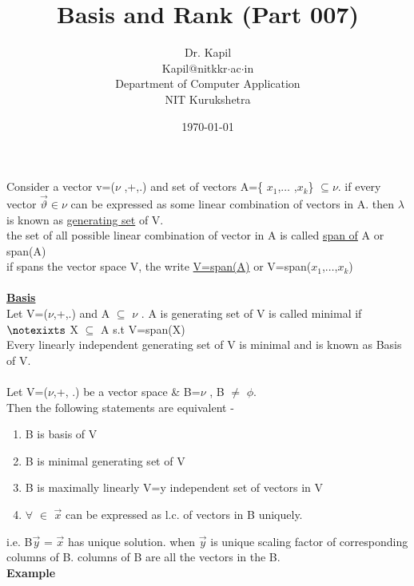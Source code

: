 \documentclass{article}
\title{Basis and Rank (Part 007)}
\author{Dr. Kapil \\Kapil$@$nitkkr$\cdot$ac$\cdot$in\\Department of Computer Application\\NIT Kurukshetra}
\date{\today}
\begin{document}
\maketitle
\thispagestyle{fancy}
Consider a vector v=($\nu$ ,+,.) and set of vectors A=\{ ${x_1}$,$\ldots$ ,${x_k}$\} $\subseteq \nu$. if every vector $\Vec{\vartheta} \in \nu $  can be expressed as some linear combination of vectors in A. then $\lambda$ is known as \underline{generating set} of V. \\

the set of all possible linear combination of vector in A is called \underline{span of} A or span(A)\\
if spans the vector space V,  the write \underline{V=span(A)} or V=span(${x_1}$,$\ldots$,${x_k}$)\\
\\
\textbf{\underline{Basis}}\\
Let V=($\nu$,+,.) and A $\subseteq$ $\nu$ . A is generating set of V is called minimal if \\
$\notexixts$ X $\subseteq$ A s.t V=span(X) \\
Every linearly independent generating set of V is minimal and is known as Basis of V.\\
\\
Let V=($\nu$,+, .) be a vector space \& B=$\nu$ , B $\ne$ $\phi$.\\
Then the following statements are equivalent -
\begin{enumerate}[i]
    \item B is basis of V
    \item B is minimal generating set of V
    \item B is maximally linearly V=y independent set of vectors in V
    \item $\forall$ $\in$ $\Vec{x}$ can be expressed as l.c. of vectors in B uniquely.
\end{enumerate}
i.e. B$\Vec{y}$ = $\Vec{x}$ has unique solution.
when $\Vec{y}$ is unique scaling factor of corresponding columns of B. columns of B are all the vectors in the B. \\
\textbf{Example}\\
\end{document}
